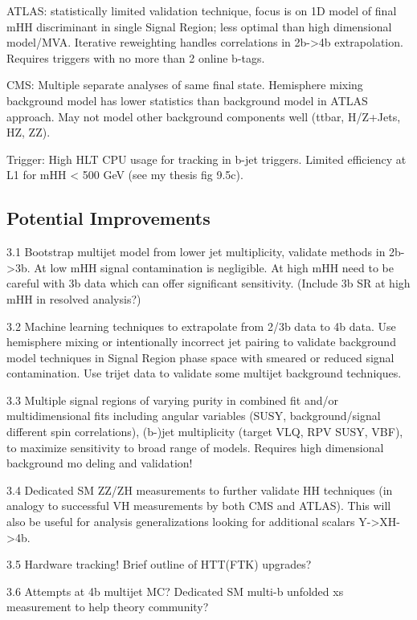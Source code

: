 ATLAS: statistically limited validation technique, focus is on 1D model of final mHH discriminant in single Signal Region; less optimal than high dimensional model/MVA.  Iterative reweighting handles correlations in 2b->4b extrapolation. Requires triggers with no more than 2 online b-tags.

CMS: Multiple separate analyses of same final state. Hemisphere mixing background model has lower statistics than background model in ATLAS approach. May not model other background components well (ttbar, H/Z+Jets, HZ, ZZ).

Trigger: High HLT CPU usage for tracking in b-jet triggers. Limited efficiency at L1 for mHH < 500 GeV (see my thesis fig 9.5c).

\subsection{Potential Improvements}
\label{sec:improvements4b}

3.1 Bootstrap multijet model from lower jet multiplicity, validate methods in 2b->3b. At low mHH signal contamination is negligible. At high mHH need to be careful with 3b data which can offer significant sensitivity. (Include 3b SR at high mHH in resolved analysis?)

3.2 Machine learning techniques to extrapolate from 2/3b data to 4b data. Use hemisphere mixing or intentionally incorrect jet pairing to validate background model techniques in Signal Region phase space with smeared or reduced signal contamination. Use trijet data to validate some multijet background techniques. 

3.3 Multiple signal regions of varying purity in combined fit and/or multidimensional fits including angular variables (SUSY, background/signal different spin correlations), (b-)jet multiplicity (target VLQ, RPV SUSY, VBF), to maximize sensitivity to broad range of models. Requires high dimensional background mo
deling and validation! 

3.4 Dedicated SM ZZ/ZH measurements to further validate HH techniques (in analogy to successful VH measurements by both CMS and ATLAS). This will also be useful for analysis generalizations looking for additional scalars Y->XH->4b. 

3.5 Hardware tracking! Brief outline of HTT(FTK) upgrades? 

3.6 Attempts at 4b multijet MC? Dedicated SM multi-b unfolded xs measurement to help theory community?
        
